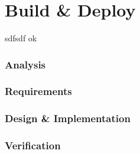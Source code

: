 \chapter{Build \& Deploy}

\blindtext
\cbstart
sdfsdf
ok
\blindtext
\cbend
\blindtext


\subsection{Analysis}
\subsection{Requirements}
\subsection{Design \& Implementation}
\subsection{Verification}


